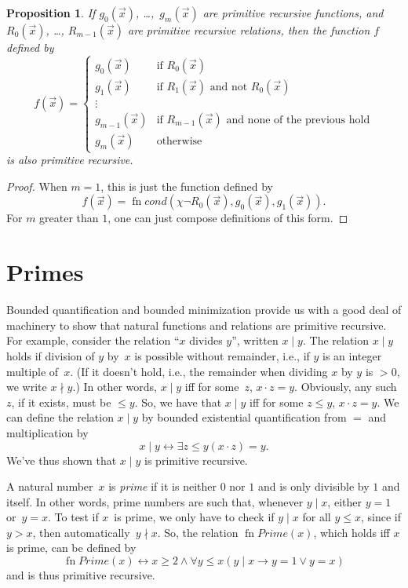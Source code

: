 \documentclass[10pt,a4paper]{article}
\theoremstyle{plain}
\newtheorem{prop}[thm]{Proposition}
\theoremstyle{definition}
\theoremstyle{remark}
\newcommand*{\olfileid}[3]{}
\newcommand*{\olsection}[1]{\section*{#1}}
\providecommand{\lif}{\mathbin{\rightarrow}}
\providecommand{\Char}{\chi}
\providecommand{\bforall}{\forall}
\providecommand{\bexists}{\exists}
\providecommand{\defiff}{\mathrel{\leftrightarrow}}
\providecommand{\fn}{\operatorname{fn}}
\providecommand{\defiff}{\mathrel{\leftrightarrow}}
\providecommand{\fn}{\operatorname{fn}}
\begin{document}
\begin{prop}
If $g_0(\vec x)$, \dots,~$g_m(\vec x)$ are primitive recursive functions, and $R_0(\vec
x)$, \dots, $R_{m-1}(\vec x)$ are primitive recursive relations, then
the function $f$ defined by
\[
f(\vec x) = \begin{cases}
    g_0(\vec x) & \text{if $R_0(\vec{x})$} \\
    g_1(\vec x) & \text{if $R_1(\vec{x})$ and not $R_0(\vec{x})$} \\
    \vdots & \\
    g_{m-1}(\vec x) & \text{if $R_{m-1}(\vec{x})$ and none of the
      previous hold}
    \\
    g_m(\vec x) & \mbox{otherwise}
\end{cases}
\]
is also primitive recursive.
\end{prop}

\begin{proof}
  When $m = 1$, this is just the function defined by
  \[
  f(\vec x) = \fn{cond}(\Char{\lnot R_0}(\vec x),g_0(\vec x),g_1(\vec
  x)).
  \]
  For $m$ greater than $1$, one can just compose definitions of this
  form.
\end{proof}




\olfileid{cmp}{rec}{pri}
\olsection{Primes}

Bounded quantification and bounded minimization provide us with a good
deal of machinery to show that natural functions and relations are
primitive recursive. For example, consider the relation ``$x$
divides $y$'', written $x \mid y$.  The relation $x \mid y$ holds if
division of $y$ by~$x$ is possible without remainder, i.e., if $y$ is
an integer multiple of~$x$.  (If it doesn't hold, i.e., the remainder
when dividing $x$ by $y$ is $> 0$, we write $x \nmid y$.) In other
words, $x \mid y$ iff for some~$z$, $x \cdot z = y$.  Obviously, any
such $z$, if it exists, must be $\leq y$. So, we have that $x \mid y$
iff for some $z \le y$, $x \cdot z = y$.  We can define the relation
$x \mid y$ by bounded existential quantification from $=$ and
multiplication by
\[
x \mid y \defiff \bexists{z \leq y}{(x \cdot z) = y}.
\]
We've thus shown that $x \mid y$ is primitive recursive.

A natural number~$x$ is \emph{prime} if it is neither $0$ nor $1$ and
is only divisible by $1$ and itself. In other words, prime numbers are
such that, whenever $y \mid x$, either $y = 1$ or~$y=x$.  To test if
$x$~is prime, we only have to check if $y \mid x$ for all $y \le x$,
since if $y > x$, then automatically~$y \nmid x$.  So, the relation
$\fn{Prime}(x)$, which holds iff $x$ is prime, can be defined by
\[
\fn{Prime}(x) \defiff x \geq 2 \land \bforall{y \leq x}{(y \mid x \lif y
  = 1 \lor y = x)}
\]
and is thus primitive recursive.
\end{document}
